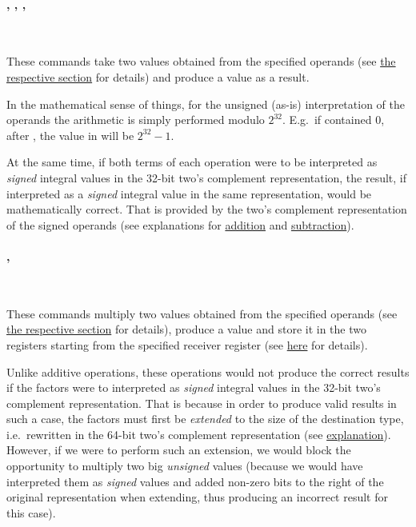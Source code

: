 \paragraph{, , , }\

These commands take two  values obtained from the specified operands (see \hyperlink{types:twos_complement}{the respective section} for details) and produce a  value as a result.

In the mathematical sense of things, for the unsigned (as-is) interpretation of the operands the arithmetic is simply performed modulo $2^{32}$. E.g.\ if  contained 0, after , the value in  will be $2^{32}-1$.

At the same time, if both terms of each operation were to be interpreted as \textit{signed} integral values in the 32-bit two's complement representation, the result, if interpreted as a \textit{signed} integral value in the same representation, would be mathematically correct.
That is provided by the two's complement representation of the signed operands (see explanations for \href{https://en.wikipedia.org/wiki/Two\%27s_complement#Addition}{addition} and \href{https://en.wikipedia.org/wiki/Two\%27s_complement#Subtraction}{subtraction}).

\vspace{-0.35cm}

\paragraph{, }\

These commands multiply two  values obtained from the specified operands (see \hyperlink{types:twos_complement}{the respective section} for details), produce a  value and store it in the two registers starting from the specified receiver register (see \hyperlink{types:two_words_storage}{here} for details).

Unlike additive operations, these operations would not produce the correct results if the factors were to interpreted as \textit{signed} integral values in the 32-bit two's complement representation. That is because in order to produce valid results in such a case, the factors must first be \textit{extended} to the size of the destination type, i.e.\ rewritten in the 64-bit two's complement representation (see \href{https://en.wikipedia.org/wiki/Two\%27s_complement#Multiplication}{explanation}). However, if we were to perform such an extension, we would block the opportunity to multiply two big \textit{unsigned} values (because we would have interpreted them as \textit{signed} values and added non-zero bits to the right of the original representation when extending, thus producing an incorrect result for this case).

